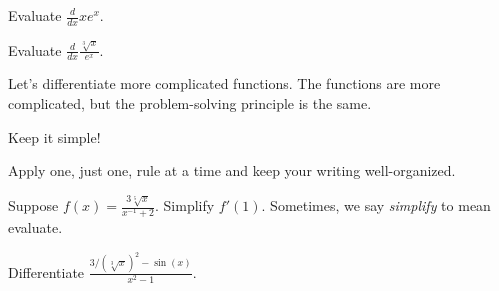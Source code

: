 \documentclass[../main.tex]{subfiles}
\begin{document}
  \begin{example}
    Evaluate \(\frac{d}{dx} x e^{x}\).

  \end{example}

  \begin{example}
    Evaluate \(\frac{d}{dx} \frac{\sqrt[3]{x}}{e^{x}}\).

  \end{example}
  \clearpage

  Let's differentiate more complicated functions. The functions are more complicated, but the problem-solving principle is the same. 
  \begin{mdframed}[style=simple]
    \color{main}
    \centering
    Keep it simple! 

    Apply one, just one, rule at a time and keep your writing well-organized.
  \end{mdframed}

  \begin{example}
    Suppose \(f(x) = \frac{3 \sqrt[5]{x}}{x^{-1} + 2}\). Simplify \(f'(1)\). 
    \newline
    {\scriptsize Sometimes, we say \emph{simplify} to mean evaluate.}

  \end{example}


  \begin{example}
    Differentiate \(\frac{3/(\sqrt[3]{x})^{2} - \sin(x)}{x^{2} - 1}\).

  \end{example}
  \clearpage
\end{document}

